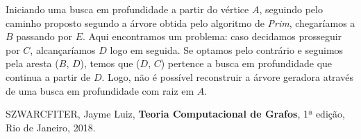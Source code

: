 \documentclass{homework}
\begin{document}
	
	
	
	Iniciando uma busca em profundidade a partir do vértice $A$, seguindo pelo caminho proposto segundo a árvore obtida pelo algoritmo de \textit{Prim}, chegaríamos a $B$ passando por $E$. Aqui encontramos um problema: caso decidamos prosseguir por $C$, alcançaríamos $D$ logo em seguida. Se optamos pelo contrário e seguimos pela aresta ($B$, $D$), temos que ($D$, $C$) pertence a busca em profundidade que continua a partir de $D$. Logo, não é possível reconstruir a árvore geradora através de uma busca em profundidade com raiz em $A$.

	\quest

	\subquest
	
	\subquest
	
	\subquest
	
	\subquest	
	\begin{thebibliography}{10}
		 SZWARCFITER, Jayme Luiz, \textbf{Teoria Computacional de Grafos}, 1ª edição, Rio de Janeiro, 2018.
	\end{thebibliography}
	\newpage
	\let\clearpage\relax
\end{document}
